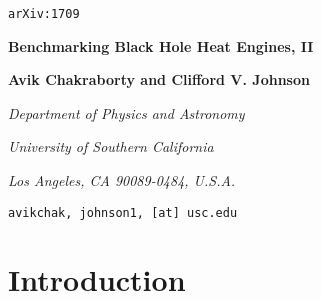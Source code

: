 \documentclass[letterpaper,11pt]{article}
\begin{document}
\begin{flushright}
{\tt arXiv:1709%
}
\end{flushright}



\bigskip
\bigskip
\bigskip
\bigskip

\bigskip
\bigskip
\bigskip
\bigskip

\begin{center}
{\Large
{\bf Benchmarking Black Hole Heat Engines, II
}
}
\end{center}


\bigskip
\begin{center}
{\bf  Avik Chakraborty and
Clifford V. Johnson}



\end{center}


\bigskip
\bigskip


\begin{center}
  \centerline{\it Department of Physics and Astronomy }
\centerline{\it University of
Southern California}
\centerline{\it Los Angeles, CA 90089-0484, U.S.A.}
\end{center}


\bigskip
\centerline{\small \tt avikchak, johnson1,  [at] usc.edu}


\bigskip
\bigskip
\bigskip

\begin{abstract} 
\noindent  
We extend to non--static black holes our benchmarking scheme that allows for  cross--comparison of the efficiencies of asymptotically AdS black holes used as working substances in heat engines.  We use a circular cycle  in the $p{-}V$ plane as the benchmark cycle. We study Kerr black holes in four spacetime dimensions as an example.  As in the static case, we find an exact formula for the benchmark efficiency in an ideal--gas--like limit, which  may serve as an upper bound for  rotating black hole heat engines in a thermodynamic ensemble with fixed angular velocity. We use the benchmarking scheme to compare Kerr to static black holes charged under Maxwell and Born--Infeld sectors. 
\end{abstract}
\newpage \baselineskip=18pt \setcounter{footnote}{0}



\section{Introduction}
\label{Intro} 
\end{document}
